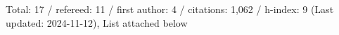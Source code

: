 Total: 17 / refereed: 11 / first author: 4 / citations: 1,062 / h-index: 9 (Last updated: 2024-11-12), List attached below